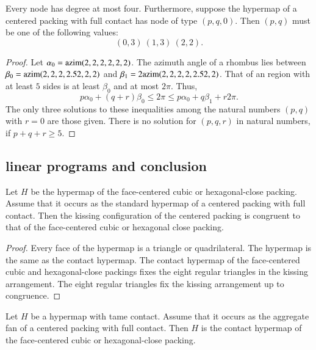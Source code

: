 \begin{lemma}\label{lemma:no-5} 
Every node has degree at most four.
Furthermore, suppose the hypermap of a centered packing with full contact has node of type $(p,q,0)$.  Then $(p,q)$ must be one of the following values:
$$
(0,3)~(1,3)~(2,2).
$$
\end{lemma}

\begin{proof} Let $\alpha_0 = {\operatorname{azim}}(2,2,2,2,2,2)$.  The azimuth angle of a rhombus lies between $\beta_0 = {\operatorname{azim}}(2,2,2,2.52,2,2)$ and
$\beta_1 = 2{\operatorname{azim}}(2,2,2,2,2.52,2)$.  That of an region with at least $5$ sides is at least $\beta_0$ and at most $2\pi$.  Thus,
$$
p\alpha_0 + (q+r) \beta_0 \le 2\pi \le p\alpha_0 + q\beta_1 + r 2\pi.
$$
The only three solutions to these inequalities among the natural numbers $(p,q)$ with $r=0$ are those given. There is no solution for $(p,q,r)$ in natural numbers, if $p+q+r\ge 5$.
\end{proof}





\subsection{linear programs and conclusion}

\begin{lemma}\label{lemma:kiss-fcc} Let $H$ be the hypermap of the face-centered cubic or hexagonal-close packing.   Assume that it occurs as the standard hypermap of a centered packing with full contact.  Then the kissing configuration of the centered packing is congruent to that of the face-centered cubic or hexagonal close packing.
\end{lemma}
%
%
%
%
%

\begin{proof} Every face of the hypermap is a triangle or quadrilateral.  The  hypermap is the same as the contact hypermap.  The contact hypermap of the face-centered cubic and hexagonal-close packings fixes the eight regular triangles in the kissing arrangement.  The eight regular triangles fix the kissing arrangement up to congruence.
\end{proof}

\begin{lemma}\label{lemma:fcc-ft} Let $H$ be a hypermap with tame contact.  Assume that it occurs as the aggregate fan of a centered packing with full contact.  Then $H$ is the contact hypermap of the face-centered cubic or hexagonal-close packing.
\end{lemma}

